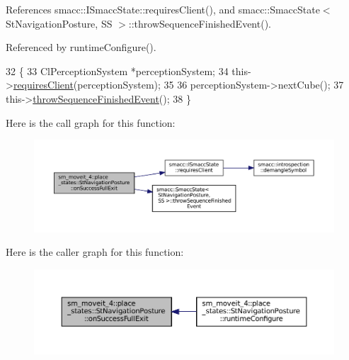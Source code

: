 References smacc\+::\+I\+Smacc\+State\+::requires\+Client(), and smacc\+::\+Smacc\+State$<$ St\+Navigation\+Posture, S\+S $>$\+::throw\+Sequence\+Finished\+Event().



Referenced by runtime\+Configure().


\begin{DoxyCode}
32             \{
33                 ClPerceptionSystem *perceptionSystem;
34                 this->\hyperlink{classsmacc_1_1ISmaccState_a7f95c9f0a6ea2d6f18d1aec0519de4ac}{requiresClient}(perceptionSystem);
35 
36                 perceptionSystem->nextCube();
37                 this->\hyperlink{classsmacc_1_1SmaccState_a49dcfc25824f7e083dd4b999c49ab2b6}{throwSequenceFinishedEvent}();
38             \}
\end{DoxyCode}
Here is the call graph for this function\+:
\nopagebreak
\begin{figure}[H]
\begin{center}
\leavevmode
\includegraphics[width=350pt]{structsm__moveit__4_1_1place__states_1_1StNavigationPosture_a95ab74dae51538aeae46f71b515bc61e_cgraph}
\end{center}
\end{figure}
Here is the caller graph for this function\+:
\nopagebreak
\begin{figure}[H]
\begin{center}
\leavevmode
\includegraphics[width=350pt]{structsm__moveit__4_1_1place__states_1_1StNavigationPosture_a95ab74dae51538aeae46f71b515bc61e_icgraph}
\end{center}
\end{figure}
\mbox{\label{structsm__moveit__4_1_1place__states_1_1StNavigationPosture_aaf8ca02fa5a8185baf6bfc55731b1926}} 
